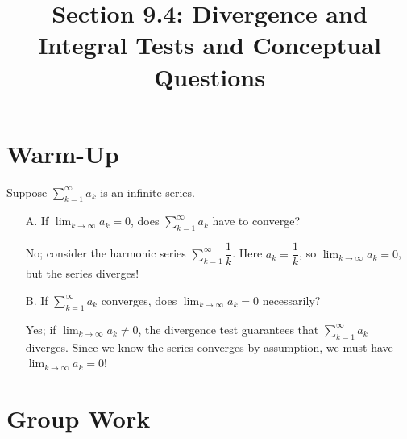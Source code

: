 \documentclass[noinstructornotes]{ximera}
\title{Section 9.4: Divergence and Integral Tests and Conceptual Questions}
\begin{document}
\begin{abstract}		\end{abstract}
\maketitle

\section{Warm-Up}
\begin{problem} Suppose $\displaystyle \sum_{k=1}^{\infty} a_k$ is an infinite series.
\begin{itemize}

\item[A.] If $\displaystyle \lim_{k \rightarrow \infty} a_k = 0$, does $\displaystyle \sum_{k=1}^{\infty} a_k$ have to converge?
\begin{freeResponse}
No; consider the harmonic series $\displaystyle \sum_{k=1}^{\infty} \dfrac{1}{k}$.  Here $a_k = \dfrac{1}{k}$, so $\displaystyle \lim_{k \rightarrow \infty} a_k = 0$, but the series diverges!
\end{freeResponse}

\item[B.] If $\displaystyle \sum_{k=1}^{\infty} a_k$ converges, does $\displaystyle \lim_{k \rightarrow \infty} a_k = 0$ necessarily?
\begin{freeResponse}
Yes; if $\displaystyle \lim_{k \rightarrow \infty} a_k \neq 0$, the divergence test guarantees that 
$\displaystyle \sum_{k=1}^{\infty} a_k$ diverges.  Since we know the series converges by assumption, we must have $\displaystyle \lim_{k \rightarrow \infty} a_k = 0$!
\end{freeResponse}
\end{itemize}
\end{problem}

\section{Group Work}
\end{document}
